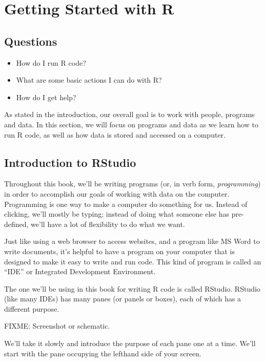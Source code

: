 \documentclass[]{Nemilov}
\providecommand{\tightlist}{%
  \setlength{\itemsep}{0pt}\setlength{\parskip}{0pt}}
\begin{document}
\hypertarget{r-getting-started}{%
\chapter{Getting Started with R}\label{r-getting-started}}

\hypertarget{r-getting-started-questions}{%
\section{Questions}\label{r-getting-started-questions}}

\begin{itemize}
\tightlist
\item
  How do I run R code?
\item
  What are some basic actions I can do with R?
\item
  How do I get help?
\end{itemize}

As stated in the introduction, our overall goal is to work with people, programs
and data. In this section, we will focus on programs and data as we learn
how to run R code, as well as
how data is stored and accessed on a computer.

\hypertarget{r-getting-started-rstudio}{%
\section{Introduction to RStudio}\label{r-getting-started-rstudio}}

Throughout this book, we'll be writing
programs (or, in verb form, \emph{programming}) in order to accomplish our goals
of working with data on the computer.
Programming is one way to make a computer do something for us.
Instead of clicking, we'll mostly be typing; instead of doing
what someone else has pre-defined, we'll have a lot of flexibility to
do what we want.

Just like using a web browser to access websites, and a program like
MS Word to write documents, it's helpful to have a program on your computer
that is designed to make it easy to write and run code. This kind of program
is called an ``IDE'' or Integrated Development Environment.

The one we'll be using in this book for writing R code is called RStudio.
RStudio (like many IDEs) has many panes (or panels or boxes),
each of which has a different purpose.

FIXME: Screenshot or schematic.

We'll take it slowly and introduce the purpose of each pane one at a time.
We'll start with the pane occupying the lefthand side of your screen.
\end{document}
